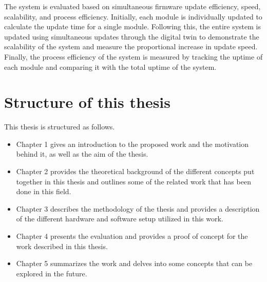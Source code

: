  The system is evaluated based on simultaneous firmware update efficiency, speed, scalability, and process efficiency. Initially, each module is individually updated to calculate the update time for a single module. Following this, the entire system is updated using simultaneous updates through the digital twin to demonstrate the scalability of the system and measure the proportional increase in update speed. Finally, the process efficiency of the system is measured by tracking the uptime of each module and comparing it with the total uptime of the system.
 
	\section{Structure of this thesis}
This thesis is structured as follows.
\begin{itemize}
    \item Chapter 1 gives an introduction to the proposed work and the motivation behind it, as well as the aim of the thesis.
    \item Chapter 2 provides the theoretical background of the different concepts put together in this thesis and outlines some of the related work that has been done in this field.
    \item Chapter 3 describes the methodology of the thesis and provides a description of the different hardware and software setup utilized in this work.
    \item Chapter 4 presents the evaluation and provides a proof of concept for the work described in this thesis.
    \item Chapter 5 summarizes the work and delves into some concepts that can be explored in the future.
\end{itemize}









	
	
	
	
	
	